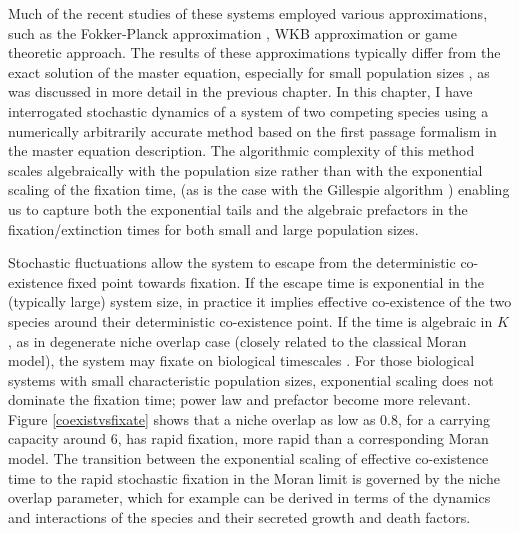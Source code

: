 Much of the recent studies of these systems employed various approximations, such as the Fokker-Planck approximation \cite{Chotibut2015,Dobrinevski2012,Fisher2014,Constable2015,Lin2012}, WKB approximation \cite{Kessler2007,Gabel2013} or game theoretic \cite{Antal2006} approach. 
The results of these approximations typically differ from the exact solution of the master equation, especially for small population sizes \cite{Doering2005,Kessler2007,Ovaskainen2010,Assaf2016,Badali2018}, as was discussed in more detail in the previous chapter. 
In this chapter, I have interrogated stochastic dynamics of a system of two competing species using a numerically arbitrarily accurate method based on the first passage formalism in the master equation description. 
The algorithmic complexity of this method scales algebraically with the population size rather than with the exponential scaling of the fixation time, (as is the case with the Gillespie algorithm \cite{Gillespie1977}) enabling us to capture both the exponential tails and the algebraic prefactors in the fixation/extinction times for both small and large population sizes. %

Stochastic fluctuations allow the system to escape from the deterministic co-existence fixed point towards fixation. 
If the escape time is exponential in the (typically large) system size, in practice it implies effective co-existence of the two species around their deterministic co-existence point. 
If the time is algebraic in $K$, as in degenerate niche overlap case (closely related to the classical Moran model), the system may fixate on biological timescales \cite{Kimura1964,Moran1962}. 
For those biological systems with small characteristic population sizes, exponential scaling does not dominate the fixation time; power law and prefactor become more relevant. 
Figure \ref{coexistvsfixate} shows that a niche overlap as low as $0.8$, for a carrying capacity around $6$, has rapid fixation, more rapid than a corresponding Moran model. 
The transition between the exponential scaling of effective co-existence time to the rapid stochastic fixation in the Moran limit is governed by the niche overlap parameter, which for example can be derived in terms of the dynamics and interactions of the species and their secreted growth and death factors. %

